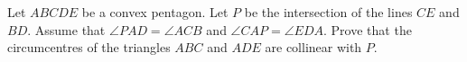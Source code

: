 Let $ABCDE$ be a convex pentagon. Let $P$ be the intersection of the lines $CE$ and $BD$. Assume that $\angle PAD = \angle ACB$ and $\angle CAP = \angle EDA$. Prove that the circumcentres of the triangles $ABC$ and $ADE$ are collinear with $P$.